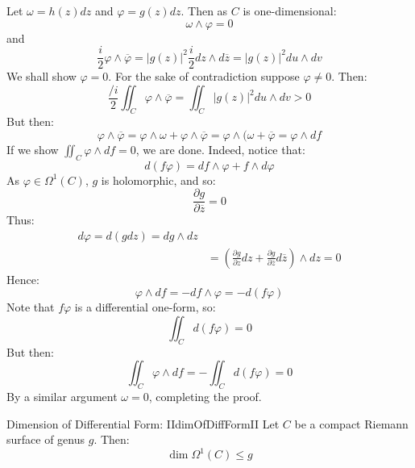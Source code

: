 \documentclass{book}
\let\temp\phi
\let\phi\varphi
\let\varphi\temp
\begin{document}
\begin{Proof}
  Let $\omega = h(z) dz$ and $\phi = g(z) dz$. Then as $C$ is one-dimensional:
  \[
    \omega \wedge  \phi = 0
  \]
  and
  \[
    \frac{i}{2} \phi \wedge  \overline{\phi} = |g(z)|^2 \frac{i}{2} dz \wedge  d \overline{z}
    = |g(z)|^2 du \wedge  dv
  \]
  We shall show $\phi = 0$. For the sake of contradiction suppose $\phi \ne 0$. Then:
  \[
    \frac{/i}{2} \iint_C \phi \wedge  \overline{\phi} = \iint_C |g(z)|^2 du \wedge dv  >0
  \]
  But then:
  \[
    \phi \wedge  \overline{\phi} = \phi \wedge  \omega + \phi \wedge  \overline{\phi} = \phi \wedge  (\omega
    + \overline{\phi} = \phi \wedge  df
  \]
  If we show $\iint_C \phi \wedge  df = 0$, we are done. Indeed, notice that:
  \[
    d(f\phi) = df \wedge  \phi + f \wedge  d\phi
  \]
  As $\phi \in \Omega^1(C)$, $g$ is holomorphic, and so:
  \[
    \frac{\partial g}{\partial \overline{z}} = 0
  \]
  Thus:
  \begin{align*}
   d\phi = d(gdz) = dg \wedge  dz\\
   &= \left(\frac{\partial g}{\partial z}dz + \frac{\partial g}{\partial \overline{z}}d \overline{z}\right)
   \wedge  dz = 0
  \end{align*}
  Hence:
  \[
    \phi \wedge  df = -df  \wedge  \phi = -d(f\phi)
  \]
  Note that $f\phi$ is a differential one-form, so:
  \[
    \iint_C d(f\phi) = 0
  \]
  But then:
  \[
    \iint_C \phi \wedge  df = - \iint_C d(f\phi) = 0
  \]
  By a similar argument $\omega =0$, completing the proof.
\end{Proof}

\begin{prop}{Dimension of Differential Form: II}{dimOfDiffFormII}
  Let $C$ be a compact Riemann surface of genus $g$. Then:
  \[
    \dim \Omega^1(C) \le g
  \]
\end{prop}
\end{document}

